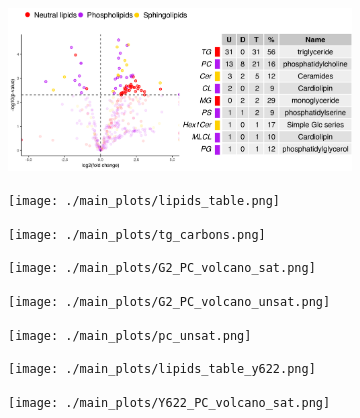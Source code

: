 \begin{figure}[H]
    \begin{subfigure}[t]{.35\textwidth}
        \caption{}
        \includegraphics[width=\textwidth]{./main_plots/iN_lipids_overview.png}        
    \end{subfigure} 
    \begin{subfigure}[t]{.35\textwidth}
        \caption{}
        \texttt{[image: ./main\_plots/lipids\_table.png]}        
    \end{subfigure} 
    \begin{subfigure}[t]{.35\textwidth}
        \caption{}
        \texttt{[image: ./main\_plots/tg\_carbons.png]}        
    \end{subfigure} 
    \begin{subfigure}[t]{.35\textwidth}
        \caption{}
        \texttt{[image: ./main\_plots/G2\_PC\_volcano\_sat.png]}        
    \end{subfigure} 
    \begin{subfigure}[t]{.35\textwidth}
        \caption{}
        \texttt{[image: ./main\_plots/G2\_PC\_volcano\_unsat.png]}        
    \end{subfigure} 
    \begin{subfigure}[t]{.35\textwidth}
        \caption{}
        \texttt{[image: ./main\_plots/pc\_unsat.png]}        
    \end{subfigure} 
    \begin{subfigure}[t]{.35\textwidth}
        \caption{}
        \texttt{[image: ./main\_plots/lipids\_table\_y622.png]}        
    \end{subfigure}
    \begin{subfigure}[t]{.35\textwidth}
        \caption{}
        \texttt{[image: ./main\_plots/Y622\_PC\_volcano\_sat.png]}        
    \end{subfigure} 
    \begin{subfigure}[t]{.35\textwidth}

\end{subfigure}
\end{figure}
